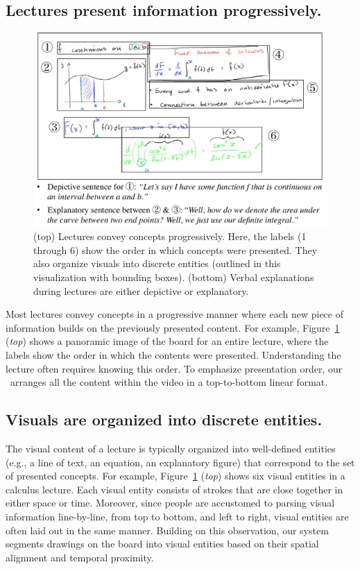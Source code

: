 \subsection*{Lectures present information progressively.}
\begin{figure}[h!]
    \centering
        \includegraphics[width=\textwidth]{figures/keyideas.pdf}
    \caption{(top) Lectures convey concepts progressively. Here, the labels (1 through 6) show the order in which concepts were presented. They also organize visuals into discrete entities (outlined in this visualization with bounding boxes). (bottom) Verbal explanations during lectures are either depictive or explanatory.}
    \label{Fig:key_ideas}
\end{figure}
%
Most lectures convey concepts in a progressive manner where each new piece of information builds on the previously presented content.
For example, Figure~\ref{Fig:key_ideas} (\textit{top}) shows a panoramic image of the board for an entire lecture, where the labels show the order in which the contents were presented. Understanding the lecture often requires knowing this order.
%
To emphasize presentation order, our \systemname\ arranges all the content within the video in a top-to-bottom linear format.
%
\subsection*{Visuals are organized into discrete entities.} The visual content of a lecture is typically organized into well-defined entities (e.g., a line of text, an equation, an explanatory figure) that correspond to the set of presented concepts. 
%
For example, Figure~\ref{Fig:key_ideas} (\textit{top}) shows six visual entities in a calculus lecture.  Each visual entity consists of strokes that are close together in either space or time. Moreover, since people are accustomed to parsing visual information line-by-line, from top to bottom, and left to right, visual entities are often laid out in the same manner. 
%
Building on this observation, our system segments drawings on the board into visual entities based on their spatial alignment and temporal proximity.
%
